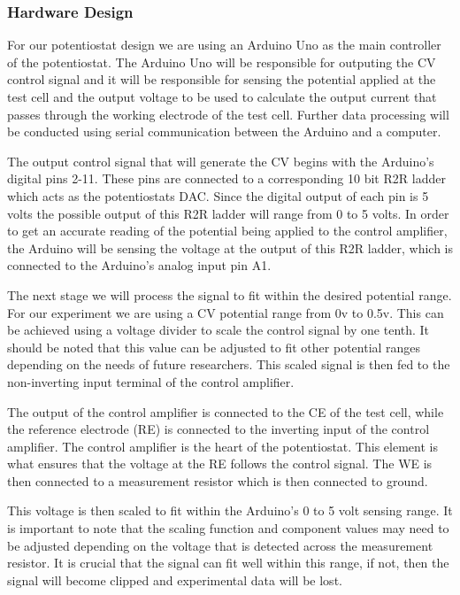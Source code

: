 \documentclass{article}
\begin{document}
\subsubsection*{Hardware Design}
For our potentiostat design we are using an Arduino Uno as the main controller of the potentiostat. The Arduino Uno will be responsible for outputing the CV control signal and it will be responsible for sensing the potential applied at the test cell and the output voltage to be used to calculate the output current that passes through the working electrode of the test cell. Further data processing will be conducted using serial communication between the Arduino and a computer.

The output control signal that will generate the CV begins with the Arduino's digital pins 2-11. These pins are connected to a corresponding 10 bit R2R ladder which acts as the potentiostats DAC. Since the digital output of each pin is 5 volts the possible output of this R2R ladder will range from 0 to 5 volts. In order to get an accurate reading of the potential being applied to the control amplifier, the Arduino will be sensing the voltage at the output of this R2R ladder, which is connected to the Arduino's analog input pin A1.

The next stage we will process the signal to fit within the desired potential range. For our experiment we are using a CV potential range from 0v to 0.5v. This can be achieved using a voltage divider to scale the control signal by one tenth. It should be noted that this value can be adjusted to fit other potential ranges depending on the needs of future researchers. This scaled signal is then fed to the non-inverting input terminal of the control amplifier. 

The output of the control amplifier is connected to the CE of the test cell, while the reference electrode (RE) is connected to the inverting input of the control amplifier. The control amplifier is the heart of the potentiostat. This element is what ensures that the voltage at the RE follows the control signal. The WE is then connected to a measurement resistor which is then connected to ground. 

This voltage is then scaled to fit within the Arduino's 0 to 5 volt sensing range. It is important to note that the scaling function and component values may need to be adjusted depending on the voltage that is detected across the measurement resistor. It is crucial that the signal can fit well within this range, if not, then the signal will become clipped and experimental data will be lost.
\end{document}
